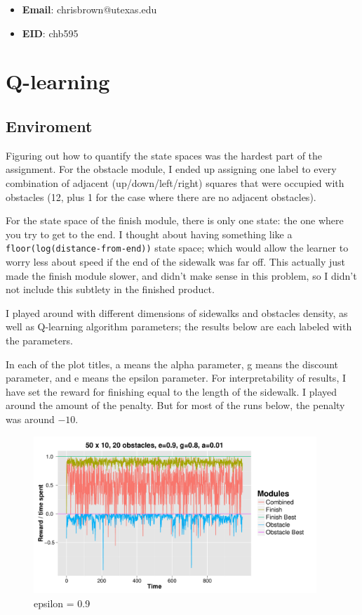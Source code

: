 \documentclass[11pt]{report}
\begin{document}
\begin{itemize}
  \item \textbf{Email}: chrisbrown@utexas.edu
  \item \textbf{EID}: chb595
\end{itemize}

\section{Q-learning}

\subsection{Enviroment}

Figuring out how to quantify the state spaces was the hardest part of the assignment. For the obstacle module, I ended up assigning one label to every combination of adjacent (up/down/left/right) squares that were occupied with obstacles (12, plus 1 for the case where there are no adjacent obstacles).

For the state space of the finish module, there is only one state: the one where you try to get to the end. I thought about having something like a \texttt{floor(log(distance-from-end))} state space; which would allow the learner to worry less about speed if the end of the sidewalk was far off. This actually just made the finish module slower, and didn't make sense in this problem, so I didn't not include this subtlety in the finished product.

I played around with different dimensions of sidewalks and obstacles density, as well as Q-learning algorithm parameters; the results below are each labeled with the parameters.

In each of the plot titles, a means the alpha parameter, g means the discount parameter, and e means the epsilon parameter.
For interpretability of results, I have set the reward for finishing equal to the length of the sidewalk. I played around the amount of the penalty. But for most of the runs below, the penalty was around $-10$.

\begin{figure}[H]
  \centering
  \includegraphics[width=0.95\textwidth]{results/qlearn-s50x10-o20.pdf}
  \caption{epsilon = 0.9}
  \label{fig:ep09}
\end{figure}
\end{document}
